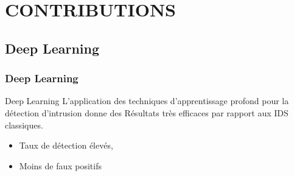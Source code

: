 \documentclass[aspectratio=169,professionalfonts, 12pt]{beamer}
\begin{document}
\section{CONTRIBUTIONS}
\subsection{Deep Learning}
\begin{frame}
\frametitle{Deep Learning}
\justifying
\begin{block}{Deep Learning}
L'application des techniques d'apprentissage profond pour la détection d'intrusion donne des Résultats très efficaces par rapport aux IDS classiques.
\begin{itemize}
	\item Taux de détection élevés,
	\item Moins de faux positifs 
\end{itemize}
\end{block}
\end{frame}
\end{document}
